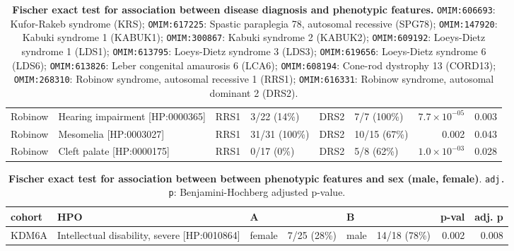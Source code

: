 \documentclass[12pt]{article}
\begin{document}
\begin{table}
\begin{scriptsize}
\begin{tabular}{l>{\raggedright}p{2.5cm}llllrr}
Robinow & Hearing impairment [HP:0000365] &RRS1& 3/22 (14\%) & DRS2 & 7/7 (100\%) & $7.7 \times 10^{-05}$ & 0.003\\
Robinow & Mesomelia [HP:0003027] & RRS1 & 31/31 (100\%) & DRS2 & 10/15 (67\%) & 0.002 & 0.043\\
Robinow & Cleft palate [HP:0000175] & RRS1 & 0/17 (0\%) & DRS2 & 5/8 (62\%) & $1.0 \times 10^{-03}$ & 0.028\\
\bottomrule
\end{tabular}
\end{scriptsize}
\caption{\textbf{Fischer exact test for association between disease diagnosis and phenotypic features.}
\texttt{OMIM:606693}: Kufor-Rakeb syndrome (KRS);
 \texttt{OMIM:617225}: Spastic paraplegia 78, autosomal recessive (SPG78);
 \texttt{OMIM:147920}: Kabuki syndrome 1 (KABUK1);
 \texttt{OMIM:300867}: Kabuki syndrome 2 (KABUK2);
 \texttt{OMIM:609192}: Loeys-Dietz syndrome 1 (LDS1);
 \texttt{OMIM:613795}:  Loeys-Dietz syndrome 3 (LDS3);
 \texttt{OMIM:619656}: Loeys-Dietz syndrome 6 (LDS6);
 \texttt{OMIM:613826}: Leber congenital amaurosis 6 (LCA6);
 \texttt{OMIM:608194}:  Cone-rod dystrophy 13 (CORD13);
 \texttt{OMIM:268310}: Robinow syndrome, autosomal recessive 1 (RRS1);
 \texttt{OMIM:616331}: Robinow syndrome, autosomal dominant 2 (DRS2).
}
\label{tab:to_do}
\end{table}



\clearpage
\newpage

\begin{table}
\centering
\begin{tabular}{l>{\raggedright}p{4cm}lp{2cm}lp{2.4cm}rr}
\toprule
\textbf{cohort} & \textbf{HPO} & \textbf{A} & \textbf{} & \textbf{B} & \textbf{} & \textbf{p-val} & \textbf{adj. p}\\
\midrule
KDM6A & Intellectual disability, severe [HP:0010864] & female & 7/25 (28\%) & male & 14/18 (78\%) & 0.002 & 0.008\\
\bottomrule
\end{tabular}
\caption{\textbf{Fischer exact test for association between  between phenotypic features and sex (male, female)}. \texttt{adj. p}: Benjamini-Hochberg adjusted p-value.}
\label{tab:mf_hpo}
\end{table}

\clearpage
\newpage
\end{document}
